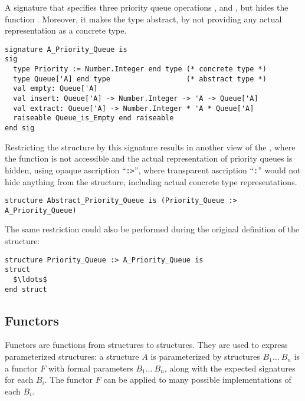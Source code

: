 \example A signature that specifies three priority queue operations ,  and , but hides the function . Moreover, it makes the  type abstract, by not providing any actual representation as a concrete type. 
\begin{lstlisting}
signature A_Priority_Queue is
sig
  type Priority := Number.Integer end type (* concrete type *)
  type Queue['A] end type                  (* abstract type *)
  val empty: Queue['A]
  val insert: Queue['A] -> Number.Integer -> 'A -> Queue['A]
  val extract: Queue['A] -> Number.Integer * 'A * Queue['A]
  raiseable Queue_is_Empty end raiseable
end sig
\end{lstlisting}
Restricting the  structure by this signature results in another view of the , where the  function is not accessible and the actual representation of priority queues is hidden, using opaque ascription ``\lstinline!:>!'', where transparent ascription ``\lstinline!:!'' would not hide anything from the structure, including actual concrete type representations. 
\begin{lstlisting}
structure Abstract_Priority_Queue is (Priority_Queue :> A_Priority_Queue)
\end{lstlisting}
The same restriction could also be performed during the original definition of the structure:
\begin{lstlisting}
structure Priority_Queue :> A_Priority_Queue is
struct 
  $\ldots$
end struct
\end{lstlisting}





\subsection{Functors}

Functors are functions from structures to structures. They are used to express parameterized structures: a structure $A$ is parameterized by structures $B_1 \ldots\ B_n$ is a functor $F$ with formal parameters $B_1 \ldots\ B_n$, along with the expected signatures for each $B_i$. The functor $F$ can be applied to many possible implementations of each $B_i$. 

